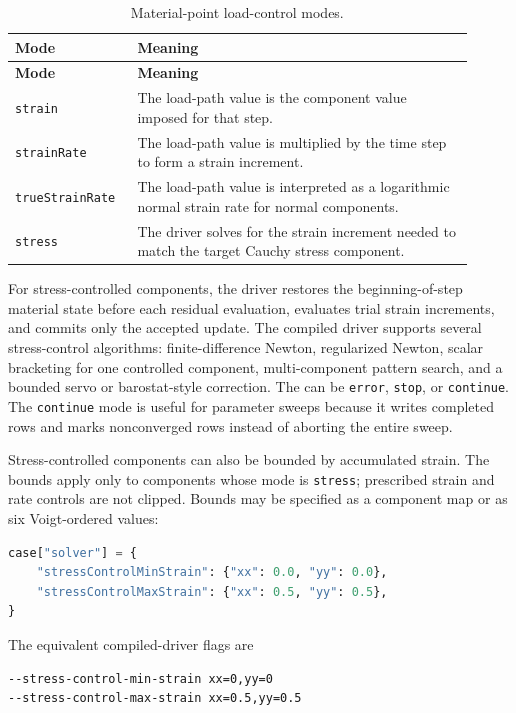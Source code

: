\begin{longtable}{@{}p{0.23\linewidth}p{0.68\linewidth}@{}}
\caption{Material-point load-control modes.\label{tab:material-point-control-modes}}\\
\toprule
\textbf{Mode} & \textbf{Meaning}\\
\midrule
\endfirsthead
\toprule
\textbf{Mode} & \textbf{Meaning}\\
\midrule
\endhead
\texttt{strain} & The load-path value is the component value imposed for that step.\\
\texttt{strainRate} & The load-path value is multiplied by the time step to form a strain increment.\\
\texttt{trueStrainRate} & The load-path value is interpreted as a logarithmic normal strain rate for normal components.\\
\texttt{stress} & The driver solves for the strain increment needed to match the target Cauchy stress component.\\
\bottomrule
\end{longtable}

For stress-controlled components, the driver restores the beginning-of-step material state before each residual evaluation, evaluates trial strain increments, and commits only the accepted update.  The compiled driver supports several stress-control algorithms: finite-difference Newton, regularized Newton, scalar bracketing for one controlled component, multi-component pattern search, and a bounded servo or barostat-style correction.  The  can be \texttt{error}, \texttt{stop}, or \texttt{continue}.  The \texttt{continue} mode is useful for parameter sweeps because it writes completed rows and marks nonconverged rows instead of aborting the entire sweep.

Stress-controlled components can also be bounded by accumulated strain.  The bounds apply only to components whose mode is \texttt{stress}; prescribed strain and rate controls are not clipped.  Bounds may be specified as a component map or as six Voigt-ordered values:
\begin{lstlisting}[language=Python,caption={Stress-control strain bounds in a Python case.},label={lst:material-point-strain-bounds},basicstyle=\ttfamily\small]
case["solver"] = {
    "stressControlMinStrain": {"xx": 0.0, "yy": 0.0},
    "stressControlMaxStrain": {"xx": 0.5, "yy": 0.5},
}
\end{lstlisting}
The equivalent compiled-driver flags are
\begin{lstlisting}[language=bash,basicstyle=\ttfamily\small]
--stress-control-min-strain xx=0,yy=0
--stress-control-max-strain xx=0.5,yy=0.5
\end{lstlisting}

